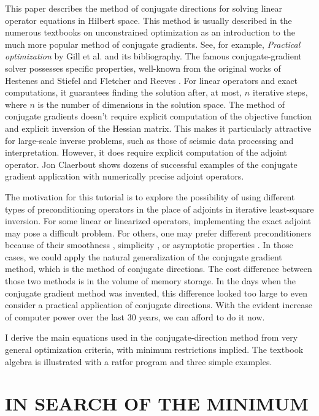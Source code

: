 This paper describes the method of conjugate directions for solving
linear operator equations in Hilbert space. This method is usually
described in the numerous textbooks on unconstrained optimization as an
introduction to the much more popular method of conjugate
gradients. See, for example, {\em Practical optimization} by Gill et
al.  and its bibliography. The famous
conjugate-gradient solver possesses specific properties, well-known
from the original works of Hestenes and Stiefel 
and Fletcher and Reeves . For linear operators and
exact computations, it guarantees finding the solution after, at most,
$n$ iterative steps, where $n$ is the number of dimensions in the
solution space. The method of conjugate gradients doesn't require
explicit computation of the objective function and explicit inversion
of the Hessian matrix. This makes it particularly attractive for
large-scale inverse problems, such as those of seismic data processing
and interpretation. However, it does require explicit computation of
the adjoint operator. Jon Claerbout
 shows dozens of
successful examples of the conjugate gradient application with
numerically precise adjoint operators.
\par
The motivation for this tutorial is to explore the possibility of
using different types of preconditioning operators in the place of
adjoints in iterative least-square inversion. For some linear or
linearized operators, implementing the exact adjoint may pose a
difficult problem. For others, one may prefer different
preconditioners because of their smoothness \cite{jon,sean},
simplicity \cite{kleinman}, or asymptotic properties \cite{herman}. In
those cases, we could apply the natural generalization of the
conjugate gradient method, which is the method of conjugate
directions. The cost difference between those two methods is in the
volume of memory storage. In the days when the conjugate gradient
method was invented, this difference looked too large to even consider
a practical application of conjugate directions. With the evident
increase of computer power over the last 30 years, we can afford to do
it now.
\par
I derive the main equations used in the conjugate-direction method
from very general optimization criteria, with minimum restrictions
implied. The textbook algebra is illustrated with a ratfor program and
three simple examples.

\section{IN SEARCH OF THE MINIMUM} 

